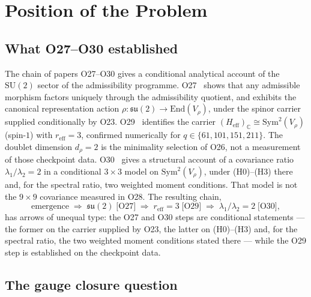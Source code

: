 \documentclass[11pt,a4paper]{article}
\theoremstyle{definition}
\theoremstyle{remark}
\newcommand{\SU}{\mathrm{SU}}
\newcommand{\Sym}{\mathrm{Sym}}
\newcommand{\End}{\mathrm{End}}
\newcommand{\Vr}{V_{\rho}}
\newcommand{\dr}{d_{\rho}}
\begin{document}
  \section{Position of the Problem}
    \label{sec:position}

    \subsection{What O27--O30 established}
      \label{ssec:o27-o30}

      The chain of papers O27--O30 gives a conditional analytical account of the $\SU(2)$ sector of
      the admissibility programme.
      O27~\cite{Beau2026a31} shows that any admissible morphism factors uniquely through the
      admissibility quotient, and exhibits the canonical representation action
      $\rho : \mathfrak{su}(2) \to \End(\Vr)$, under the spinor carrier supplied conditionally by
      O23.
      O29~\cite{Beau2026a33} identifies the carrier $(H_{\mathrm{eff}})_{\mathbb{C}} \cong \Sym^2(\Vr)$
      (spin-$1$) with $r_{\mathrm{eff}} = 3$, confirmed numerically for $q \in \{61, 101, 151, 211\}$.
      The doublet dimension $\dr = 2$ is the minimality selection of O26, not a measurement of
      those checkpoint data.
      O30~\cite{Beau2026a34} gives a structural account of a covariance ratio
      $\lambda_1/\lambda_2 = 2$ in a conditional $3\times3$ model on $\Sym^2(\Vr)$, under
      (H0)--(H3) there and, for the spectral ratio, two weighted moment conditions.
      That model is not the $9\times9$ covariance measured in O28.
      The resulting chain,
      \begin{equation}
        \label{eq:su2-chain}
        \text{emergence} \;\Rightarrow\; \mathfrak{su}(2)\;\text{[O27]}
        \;\Rightarrow\; r_{\mathrm{eff}} = 3\;\text{[O29]}
        \;\Rightarrow\; \lambda_1/\lambda_2 = 2\;\text{[O30]},
      \end{equation}
      has arrows of unequal type: the O27 and O30 steps are conditional statements --- the former on
      the carrier supplied by O23, the latter on (H0)--(H3) and, for the spectral ratio,
      the two weighted moment conditions stated there --- while the O29 step is established on the checkpoint
      data.

    \subsection{The gauge closure question}
      \label{ssec:gauge-closure}
\end{document}
